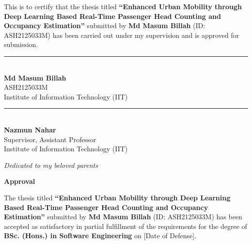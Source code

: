 \documentclass[12pt,a4paper]{report}
\begin{document}
\noindent This is to certify that the thesis titled \textbf{``Enhanced Urban Mobility through Deep Learning Based Real-Time Passenger Head Counting and Occupancy Estimation''}
submitted by \textbf{Md Masum Billah} (ID: ASH2125033M) has been carried out under my
supervision and is approved for submission.

\vspace{3cm}

\noindent
\begin{minipage}[t]{0.45\textwidth}
    \rule{6cm}{0.4pt}\\
    \textbf{Md Masum Billah}\\
    ASH2125033M\\
    Institute of Information Technology (IIT)
\end{minipage}
\hfill
\begin{minipage}[t]{0.45\textwidth}
    \rule{6cm}{0.4pt}\\
    \textbf{Nazmun Nahar}\\
    Supervisor, Assistant Professor\\
    Institute of Information Technology (IIT)
\end{minipage}


\newpage
{}
{}
\thispagestyle{empty}
\vspace*{5cm}
\begin{center}
    \textit{Dedicated to my beloved parents}
\end{center}


\newpage
{}
{}
\thispagestyle{empty}
\begin{center}
    \Large\textbf{Approval}
\end{center}
\vspace{1cm}

\noindent The thesis titled \textbf{``Enhanced Urban Mobility through Deep Learning Based Real-Time Passenger Head Counting and Occupancy Estimation''} submitted by
\textbf{Md Masum Billah} (ID: ASH2125033M) has been accepted as satisfactory in partial
fulfillment of the requirements for the degree of \textbf{BSc. (Hons.) in Software Engineering} on
[Date of Defense].
\end{document}
